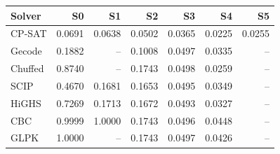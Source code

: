\begin{tabular}{lrrrrrr}
\toprule
Solver & S0 & S1 & S2 & S3 & S4 & S5 \\
\midrule
CP-SAT & 0.0691 & 0.0638 & 0.0502 & 0.0365 & 0.0225 & 0.0255 \\
Gecode & 0.1882 & -- & 0.1008 & 0.0497 & 0.0335 & -- \\
Chuffed & 0.8740 & -- & 0.1743 & 0.0498 & 0.0259 & -- \\
SCIP & 0.4670 & 0.1681 & 0.1653 & 0.0495 & 0.0349 & -- \\
HiGHS & 0.7269 & 0.1713 & 0.1672 & 0.0493 & 0.0327 & -- \\
CBC & 0.9999 & 1.0000 & 0.1743 & 0.0496 & 0.0448 & -- \\
GLPK & 1.0000 & -- & 0.1743 & 0.0497 & 0.0426 & -- \\
\bottomrule
\end{tabular}
